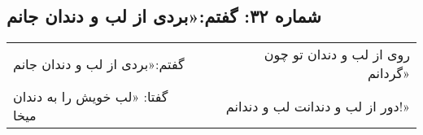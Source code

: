 \begin{center}
\section*{شماره ۳۲: گفتم:‌«بردی از لب و دندان جانم}
\label{sec:032}
\begin{longtable}{l p{0.5cm} r}
گفتم:‌«بردی از لب و دندان جانم
&&
روی از لب و دندان تو چون گردانم»
\\
گفتا: «لب خویش را به دندان میخا
&&
دور از لب و دندانت لب و دندانم!»
\\
\end{longtable}
\end{center}
